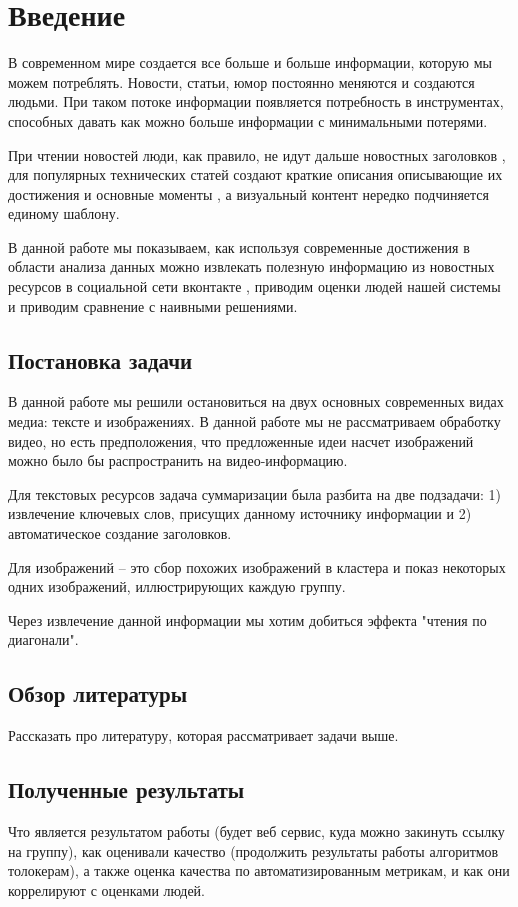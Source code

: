 \documentclass[aps,%
12pt,%
final,%
oneside,
onecolumn,%
musixtex, %
superscriptaddress,%
centertags]{article} %
\begin{document}
\section{Введение}
В современном мире создается все больше и больше информации, которую мы можем потреблять.
Новости, статьи, юмор постоянно меняются и создаются людьми. При таком потоке информации
появляется потребность в инструментах, способных давать как можно больше информации
с минимальными потерями.

При чтении новостей люди, как правило, не идут дальше новостных заголовков \cite{},
для популярных технических статей создают краткие описания описывающие их достижения
и основные моменты \cite{}, а визуальный контент нередко подчиняется единому шаблону.

В данной работе мы показываем, как используя современные достижения в области анализа
данных можно извлекать полезную информацию из новостных ресурсов в социальной сети вконтакте \cite{},
приводим оценки людей нашей системы и приводим сравнение с наивными решениями.

\subsection{Постановка задачи}
В данной работе мы решили остановиться на двух основных современных видах медиа: тексте и
изображениях. В данной работе мы не рассматриваем обработку видео, но есть предположения,
что предложенные идеи насчет изображений можно было бы распространить на видео-информацию.

Для текстовых ресурсов задача суммаризации была разбита на две подзадачи: 1) извлечение 
ключевых слов, присущих данному источнику информации и 2) автоматическое создание заголовков.

Для изображений -- это сбор похожих изображений в кластера и показ некоторых
одних изображений, иллюстрирующих каждую группу.

Через извлечение данной информации мы хотим добиться эффекта "чтения по диагонали".
\subsection{Обзор литературы}
Рассказать про литературу, которая рассматривает задачи выше.
\subsection{Полученные результаты}
Что является результатом работы (будет веб сервис, куда можно закинуть ссылку на группу),
как оценивали качество (продолжить результаты работы алгоритмов толокерам), а также
оценка качества по автоматизированным метрикам, и как они коррелируют с оценками людей.
\end{document}
